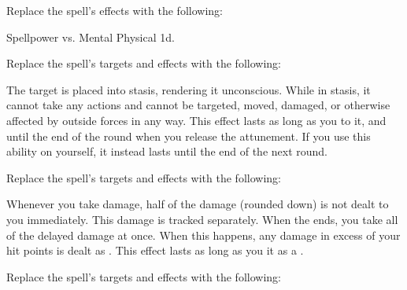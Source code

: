 Replace the spell's effects with the following:
\begin{spellcontent}
\begin{augmenteffects}
\begin{spellattack}{Spellpower vs. Mental}
\spellsuccess Physical  \plus1d.
\end{spellattack}
\end{augmenteffects}
\end{spellcontent}
Replace the spell's targets and effects with the following:
\begin{spellcontent}
\begin{augmenttargetinginfo}
\end{augmenttargetinginfo}
\begin{augmenteffects}
\spelleffect
The target is placed into stasis, rendering it unconscious.
While in stasis, it cannot take any actions and cannot be targeted, moved, damaged, or otherwise affected by outside forces in any way.
This effect lasts as long as you  to it, and until the end of the round when you release the attunement.
If you use this ability on yourself, it instead lasts until the end of the next round.
\end{augmenteffects}
\end{spellcontent}
Replace the spell's targets and effects with the following:
\begin{spellcontent}
\begin{augmenttargetinginfo}
\end{augmenttargetinginfo}
\begin{augmenteffects}
\spelleffect
Whenever you take damage, half of the damage (rounded down) is not dealt to you immediately.
This damage is tracked separately.
When the ends, you take all of the delayed damage at once.
When this happens, any damage in excess of your hit points is dealt as .
This effect lasts as long as you  it as a .
\end{augmenteffects}
\end{spellcontent}
Replace the spell's targets and effects with the following:
